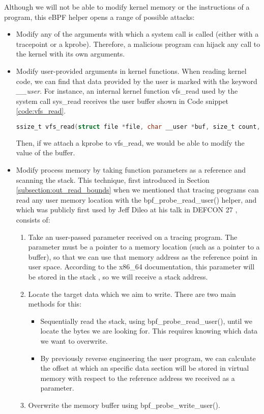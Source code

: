 Although we will not be able to modify kernel memory or the instructions of a program, this eBPF helper opens a range of possible attacks:
\begin{itemize}
\item Modify any of the arguments with which a system call is called (either with a tracepoint or a kprobe). Therefore, a malicious program can hijack any call to the kernel with its own arguments.
\item Modify user-provided arguments in kernel functions. When reading kernel code, we can find that data provided by the user is marked with the keyword \textit{\_\_user}. For instance, an internal kernel function vfs\_read used by the system call sys\_read receives the user buffer shown in Code snippet \ref{code:vfs_read}.
\begin{lstlisting}[language=C, caption={Definition of kernel function vfs\_read \cite{code_vfs_read}.}, label={code:vfs_read}]
ssize_t vfs_read(struct file *file, char __user *buf, size_t count, loff_t *pos)
\end{lstlisting}
Then, if we attach a kprobe to vfs\_read, we would be able to modify the value of the buffer.
\item Modify process memory by taking function parameters as a reference and scanning the stack. This technique, first introduced in Section \ref{subsection:out_read_bounds} when we mentioned that tracing programs can read any user memory location with the bpf\_probe\_read\_user() helper, and which was publicly first used by Jeff Dileo at his talk in DEFCON 27 \cite{evil_ebpf_p6974}, consists of:
\begin{enumerate}
\item Take an user-passed parameter received on a tracing program. The parameter must be a pointer to a memory location (such as a pointer to a buffer), so that we can use that memory address as the reference point in user space. According to the x86\_64 documentation, this parameter will be stored in the stack \cite{8664_params_abi_p1922}, so we will receive a stack address.
\item Locate the target data which we aim to write. There are two main methods for this:
\begin{itemize}
	\item Sequentially read the stack, using bpf\_probe\_read\_user(), until we locate the bytes we are looking for. This requires knowing which data we want to overwrite.
	\item By previously reverse engineering the user program, we can calculate the offset at which an specific data section will be stored in virtual memory with respect to the reference address we received as a parameter.
\end{itemize}
\item Overwrite the memory buffer using bpf\_probe\_write\_user().
\end{enumerate}
\end{itemize}

